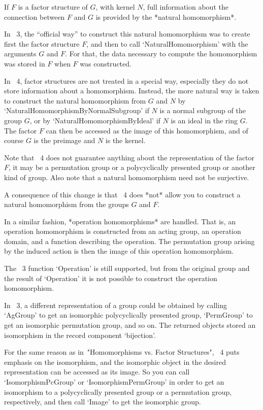If $F$ is a factor structure of $G$, with kernel $N$,
full information about the connection between $F$ and $G$ is provided by
the *natural homomorphism*.

In {\GAP}~3, the ``official way'' to construct this natural homomorphism
was to create first the factor structure $F$, and then to call
`NaturalHomomorphism' with the arguments $G$ and $F$.
For that, the data necessary to compute the homomorphism was stored in
$F$ when $F$ was constructed.

In {\GAP}~4, factor structures are not treated in a special way,
especially they do not store information about a homomorphism.
Instead, the more natural way is taken to construct the natural
homomorphism from $G$ and $N$ by `NaturalHomomorphismByNormalSubgroup'
if $N$ is a normal subgroup of the group $G$,
or by `NaturalHomomorphismByIdeal' if $N$ is an ideal in the ring $G$.
The factor $F$ can then be accessed as the image of this homomorphism,
and of course $G$ is the preimage and $N$ is the kernel.

Note that {\GAP}~4 does not guarantee anything about the representation
of the factor $F$, it may be a permutation group or a polycyclically
presented group or another kind of group.
Also note that a natural homomorphism need not be surjective.

A consequence of this change is that {\GAP}~4 does *not* allow you to
construct a natural homomorphism from the groups $G$ and $F$.

In a similar fashion, *operation homomorphisms* are handled.
That is, an operation homomorphism is constructed from an acting group,
an operation domain, and a function describing the operation.
The permutation group arising by the induced action is then the image
of this operation homomorphism.

The {\GAP}~3 function `Operation' is still supported,
but from the original group and the result of `Operation' it is not
possible to construct the operation homomorphism.



In {\GAP}~3, a different representation of a group could be obtained by
calling `AgGroup' to get an isomorphic polycyclically presented group,
`PermGroup' to get an isomorphic permutation group, and so on.
The returned objects stored an isomorphism in the record component
`bijection'.

For the same reason as in~"Homomorphisms vs. Factor Structures",
{\GAP}~4 puts emphasis on the isomorphism,
and the isomorphic object in the desired representation can be accessed
as its image.
So you can call `IsomorphismPcGroup' or `IsomorphismPermGroup' in order
to get an isomorphism to a polycyclically presented group or a
permutation group, respectively, and then call `Image' to get the
isomorphic group.

